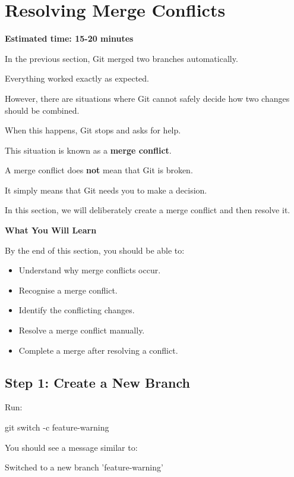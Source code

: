 \documentclass{csc2059practical}
\begin{document}
\section{Resolving Merge Conflicts}
\begin{infobox}
\textbf{Estimated time: 15-20 minutes}
\end{infobox}
In the previous section, Git merged two branches automatically.

Everything worked exactly as expected.

However, there are situations where Git cannot safely decide how two changes should be combined.

When this happens, Git stops and asks for help.

This situation is known as a \textbf{merge conflict}.

A merge conflict does \textbf{not} mean that Git is broken.

It simply means that Git needs you to make a decision.

In this section, we will deliberately create a merge conflict and then resolve it.

\begin{learningoutcomes}
\textbf{What You Will Learn}\par
\medskip
By the end of this section, you should be able to:

\begin{itemize}
  \item Understand why merge conflicts occur.
  \item Recognise a merge conflict.
  \item Identify the conflicting changes.
  \item Resolve a merge conflict manually.
  \item Complete a merge after resolving a conflict.
\end{itemize}
\end{learningoutcomes}
\subsection{Step 1: Create a New Branch}
Run:

\begin{terminalplain}
git switch -c feature-warning
\end{terminalplain}
You should see a message similar to:

\begin{terminalplain}
Switched to a new branch 'feature-warning'
\end{terminalplain}
\end{document}
